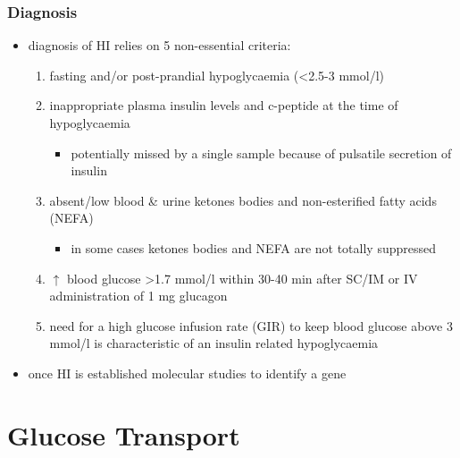 \documentclass{scrartcl}
\begin{document}
\subsubsection{Diagnosis}
\label{sec:org1416c14}
\begin{itemize}
\item diagnosis of HI relies on 5 non-essential criteria:
\begin{enumerate}
\item fasting and/or post-prandial hypoglycaemia (\textless{}2.5-3 mmol/l)
\item inappropriate plasma insulin levels and c-peptide at the time of
hypoglycaemia
\begin{itemize}
\item potentially missed by a single sample because of pulsatile
secretion of insulin
\end{itemize}
\item absent/low blood \& urine ketones bodies and non-esterified fatty
acids (NEFA)
\begin{itemize}
\item in some cases ketones bodies and NEFA are not totally
suppressed
\end{itemize}
\item \(\uparrow\) blood glucose \textgreater{}1.7 mmol/l within 30-40 min after
SC/IM or IV administration of 1 mg glucagon
\item need for a high glucose infusion rate (GIR) to keep blood
glucose above 3 mmol/l is characteristic of an insulin related
hypoglycaemia
\end{enumerate}

\item once HI is established molecular studies to identify a gene
\end{itemize}
\section{Glucose Transport}
\label{sec:org464b6d8}
\end{document}
